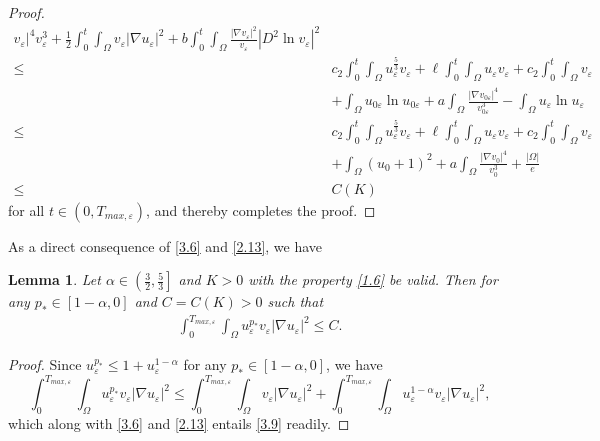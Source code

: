 \documentclass[12pt]{article}
\theoremstyle{plain}
\newtheorem{lemma}{Lemma}[section]
\theoremstyle{definition}
\numberwithin{equation}{section}
\begin{document}
\begin{proof}
\begin{align*}
{     v_{\varepsilon}|^4}{v_{\varepsilon}^3}+\frac{1}{2}\int_0^{t}\int_{\Omega}v_{\varepsilon}|\nabla
     u_{\varepsilon}|^2+b\int_0^{t}\int_{\Omega}\frac{|\nabla v_{\varepsilon}|^{2}}{v_{\varepsilon}}|D^2\ln{v_{\varepsilon}}|^2 \nonumber
    \\
    \leq& c_2\int_0^{t}\int_{\Omega}
    u_{\varepsilon}^{\frac{5}{3}}v_{\varepsilon}+\ell\int_0^{t}\int_{\Omega}u_{\varepsilon}v_{\varepsilon}+c_2\int_0^{t}\int_{\Omega}v_{\varepsilon}\nonumber
    \\
    &+\int_{\Omega} u_{0\varepsilon} \ln u_{0\varepsilon}+a \int_{\Omega} \frac{\left|\nabla
    v_{0\varepsilon}\right|^4}{v_{0\varepsilon}^3}-\int_{\Omega} u_{\varepsilon} \ln u_{\varepsilon}\nonumber
    \\
    \leq &c_2\int_0^{t}\int_{\Omega}
    u_{\varepsilon}^{\frac{5}{3}}v_{\varepsilon}+\ell\int_0^{t}\int_{\Omega}u_{\varepsilon}v_{\varepsilon}+c_2
\int_0^{t}\int_{\Omega}v_{\varepsilon}\nonumber
    \\
    &+\int_{\Omega} (u_0+1)^2+a\int_{\Omega} \frac{\left|\nabla
    v_{0}\right|^4}{v_{0}^3}+\frac{|\Omega|}{e}\nonumber
    \\
    \leq&C(K)
\end{align*}
for all $t\in (0,T_{max,\varepsilon})$, and thereby completes the proof.
\end{proof}

As a direct consequence of  \eqref{3.6} and  \eqref{2.13}, we have

\begin{lemma} \label{lemma3.4} Let $\alpha\in\left(\frac{3}{2},\frac{5}{3}\right]$ and $K>0$ with the
property \eqref{1.6} be valid. Then for any  $p_*\in [1-\alpha, 0]$ and $C=C(K)>0$ such that
\begin{align}\label{3.9}
\int_0^{T_{max,\varepsilon}}\int_{\Omega}u_{\varepsilon}^{p_*}v_{\varepsilon}|\nabla u_{\varepsilon}|^2\leq C.
\end{align}
\end{lemma}
\begin{proof} Since  $ u_{\varepsilon}^{p_*}\leq 1+u_{\varepsilon}^{1-\alpha}$
for   any
$p_*\in [1-\alpha, 0]$, we have
$$
\int_0^{T_{max,\varepsilon}}\int_{\Omega} u_{\varepsilon}^{p_*}v_{\varepsilon}|\nabla u_{\varepsilon}|^2 \leq  \int_0^{T_{max,\varepsilon}}\int_{\Omega}
v_{\varepsilon}|\nabla u_{\varepsilon}|^2+\int_0^{T_{max,\varepsilon}}\int_{\Omega}u_{\varepsilon}^{1-\alpha}v_{\varepsilon}|\nabla u_{\varepsilon}|^2,
$$
which along with  \eqref{3.6} and \eqref{2.13} entails \eqref{3.9}   readily.
 \end{proof}
\end{document}
